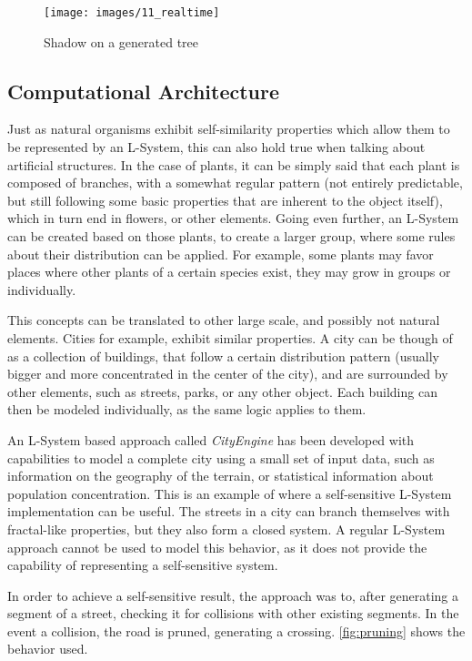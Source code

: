 \documentclass{acmtog}
\begin{document}
\begin{figure}[!htp]
  \begin{center}
    \texttt{[image: images/11\_realtime]}
    \caption{Shadow on a generated tree \label{fig:realtime2}}
    \end{center}
\end{figure}

\subsection{Computational Architecture}
\label{subsec:architecture}

Just as natural organisms exhibit self-similarity properties which allow them to be represented by an L-System, this can also hold true when talking about artificial structures. In the case of plants, it can be simply said that each plant is composed of branches, with a somewhat regular pattern (not entirely predictable, but still following some basic properties that are inherent to the object itself), which in turn end in flowers, or other elements. Going even further, an L-System can be created based on those plants, to create a larger group, where some rules about their distribution can be applied. For example, some plants may favor places where other plants of a certain species exist, they may grow in groups or individually.

This concepts can be translated to other large scale, and possibly not natural elements. Cities for example, exhibit similar properties. A city can be though of as a collection of buildings, that follow a certain distribution pattern (usually bigger and more concentrated in the center of the city), and are surrounded by other elements, such as streets, parks, or any other object. Each building can then be modeled individually, as the same logic applies to them.

An L-System based approach called \emph{CityEngine} has been developed with capabilities to model a complete city using a small set of input data, such as information on the geography of the terrain, or statistical information about population concentration. This is an example of where a self-sensitive L-System implementation can be useful. The streets in a city can branch themselves with fractal-like properties, but they also form a closed system. A regular L-System approach cannot be used to model this behavior, as it does not provide the capability of representing a self-sensitive system.

In order to achieve a self-sensitive result, the approach was to, after generating a segment of a street, checking it for collisions with other existing segments. In the event a collision, the road is pruned, generating a crossing. \autoref{fig:pruning} shows the behavior used.
\end{document}
